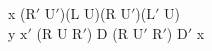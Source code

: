 x ($\text{R}'$ $\text{U}'$)(L U)(R $\text{U}'$)($\text{L}'$ U)\\
y $\text{x}'$ (R U $\text{R}'$) D (R $\text{U}'$ $\text{R}'$) $\text{D}'$ x\\
